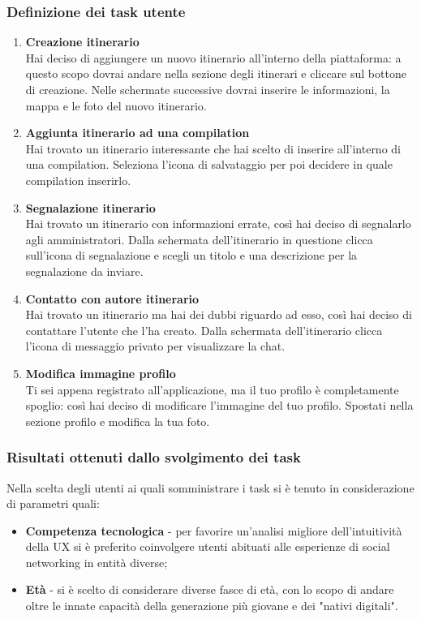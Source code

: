 \documentclass{natourDoc}
\begin{document}
\subsubsection{Definizione dei task utente}
\begin{enumerate}
	\item \textbf{Creazione itinerario} \\
	      Hai deciso di aggiungere un nuovo itinerario all’interno della piattaforma: a questo scopo
	      dovrai andare nella sezione degli itinerari e cliccare sul bottone di creazione. Nelle schermate successive dovrai inserire le informazioni, la mappa e le foto del nuovo itinerario.
	\item \textbf{Aggiunta itinerario ad una compilation} \\
	      Hai trovato un itinerario interessante che hai scelto di inserire all’interno di una compilation. Seleziona l’icona di salvataggio per poi decidere in quale compilation inserirlo.
	\item \textbf{Segnalazione itinerario} \\
	      Hai trovato un itinerario con informazioni errate, così hai deciso di segnalarlo agli amministratori. Dalla schermata dell’itinerario in questione clicca sull'icona di segnalazione e
	      scegli un titolo e una descrizione per la segnalazione da inviare.
	\item \textbf{Contatto con autore itinerario} \\
	      Hai trovato un itinerario ma hai dei dubbi riguardo ad esso, così hai deciso di contattare l’utente che l’ha creato. Dalla schermata dell’itinerario clicca l'icona di messaggio privato per visualizzare la chat.
	\item  \textbf{Modifica immagine profilo} \\
	      Ti sei appena registrato all'applicazione, ma il tuo profilo è completamente spoglio: così hai deciso di modificare l’immagine del tuo profilo. Spostati nella sezione profilo e modifica la tua foto.
\end{enumerate}

\newpage

\subsubsection{Risultati ottenuti dallo svolgimento dei task}
Nella scelta degli utenti ai quali somministrare i task si è tenuto in considerazione di parametri quali:
\begin{itemize}
	\item \textbf{Competenza tecnologica} - per favorire un'analisi migliore dell'intuitività della UX si è preferito coinvolgere utenti abituati alle esperienze di social networking in entità diverse;
	\item \textbf{Età} - si è scelto di considerare diverse fasce di età, con lo scopo di andare oltre le innate capacità della generazione più giovane e dei "nativi digitali".
\end{itemize}
\end{document}
